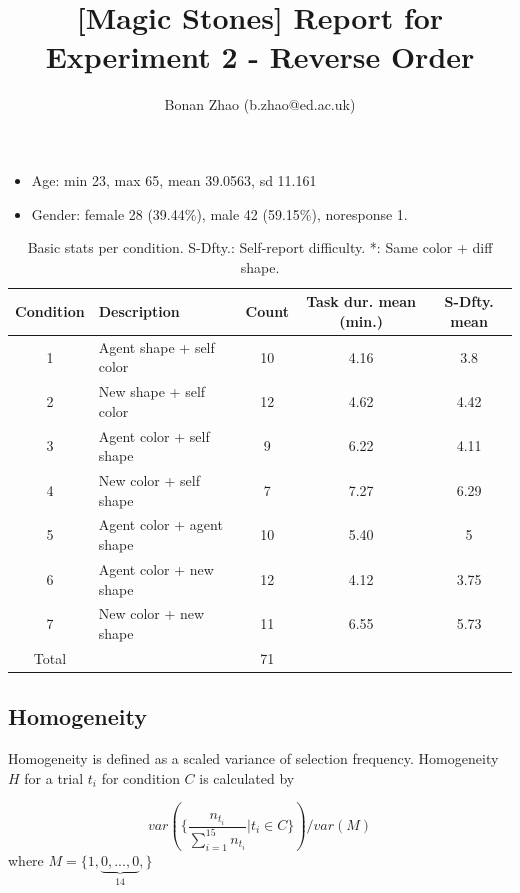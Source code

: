 \documentclass{article}
\title{[Magic Stones] Report for Experiment 2 - Reverse Order}
\author{Bonan Zhao (b.zhao@ed.ac.uk)}
\begin{document}
\maketitle


\begin{itemize}
  \item Age: min 23, max 65, mean 39.0563, sd 11.161 
  \item Gender: female 28 (39.44\%), male 42 (59.15\%), noresponse 1.
\end{itemize}

\begin{table}[h!]
  \centering
  \begin{tabular}{c|l|c|c|c}
  Condition & Description & Count & Task dur. mean (min.) & S-Dfty. mean \\
  \hline
  1 & Agent shape + self color  & 10  & 4.16 & 3.8  \\
  2 & New shape + self color    & 12  & 4.62 & 4.42 \\
  3 & Agent color + self shape  & 9   & 6.22 & 4.11 \\
  4 & New color + self shape    & 7   & 7.27 & 6.29 \\
  5 & Agent color + agent shape & 10  & 5.40 & 5    \\
  6 & Agent color + new shape   & 12  & 4.12 & 3.75 \\
  7 & New color + new shape     & 11  & 6.55 & 5.73 \\
  \hline
  Total    &                       & 71    & & \\
  \end{tabular}
  \caption{Basic stats per condition. S-Dfty.: Self-report difficulty.
  *: Same color + diff shape.}
  \label{table:conditions}
\end{table}

\subsection*{Homogeneity}

Homogeneity is defined as a scaled variance of selection frequency. Homogeneity $H$ for a trial $t_i$ for condition $C$ is calculated by

\[
var(\{\frac{n_{t_i}}{\sum_{i=1}^{15} n_{t_i}} | t_i \in C\})/var(M)
\]
where $M = \{1, \underbrace{0, ..., 0}_{14}, \}$
\end{document}
